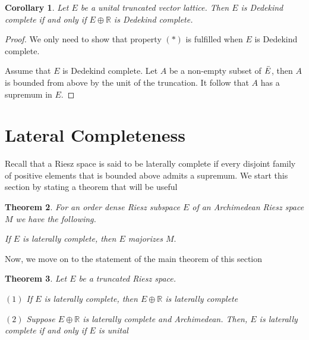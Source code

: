 \documentclass{birkau}
\numberwithin{equation}{section}
\theoremstyle{plain}
\newtheorem{theorem}{Theorem}[section]
\newtheorem{corollary}[theorem]{Corollary}
\theoremstyle{definition}
\begin{document}
\begin{corollary}
	Let $E$ be a unital truncated vector lattice. Then $E$ is Dedekind complete
	if and only if $E\oplus 
	\mathbb{R}
	$ is Dedekind complete.
\end{corollary}

\begin{proof}
	We only need to show that property $\left( \ast \right) $ is fulfilled when $%
	E$ is Dedekind complete. 
	
	Assume that $E$ is Dedekind complete. Let $A$ be a non-empty subset of $\bar{%
		E}$, then $A$ is bounded from above by the unit of the truncation. It follow
	that $A$ has a supremum in $E.$
\end{proof}
\section{Lateral Completeness}
Recall that a Riesz space is said to be laterally complete if every disjoint family of positive elements that is bounded above admits a supremum.
We start this section by stating a theorem that will be useful

\begin{theorem}
	\cite[Theorem 7.15]{locallysolid} For an order dense Riesz subspace $E$ of an
	Archimedean Riesz space $M$ we have the following.
	
	If $E$ is laterally complete, then $E$ majorizes $M.$
\end{theorem}

Now, we move on to the statement of the main theorem of this section

\begin{theorem}
	Let $E$ be a truncated Riesz space.
	
	$\left( 1\right) $ If $E$ is laterally complete, then $E\oplus 
	\mathbb{R}
	$ is laterally complete
	
	$\left( 2\right) $ Suppose $E\oplus 
	\mathbb{R}
	$ is laterally complete and Archimedean. Then,  $E$ is laterally complete if
	and only if $E$ is unital
\end{theorem}
\end{document}
